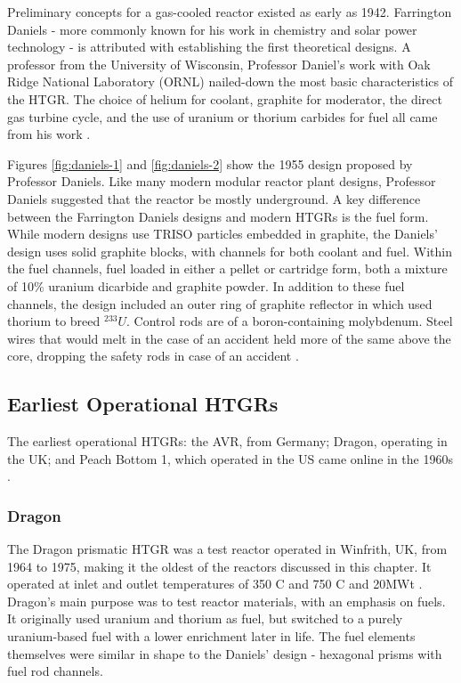 Preliminary concepts for a gas-cooled reactor existed as early as 1942.  Farrington Daniels - more commonly known for his work in chemistry and solar power technology - is attributed with establishing the first theoretical designs.  A professor from the University of Wisconsin, Professor Daniel's work with Oak Ridge National Laboratory (ORNL) nailed-down the most basic characteristics of the HTGR.  The choice of helium for coolant, graphite for moderator, the direct gas turbine cycle, and the use of uranium or thorium carbides for fuel all came from his work \cite{simnad_early_1991}.




Figures \ref{fig:daniels-1} and \ref{fig:daniels-2} show the 1955 design proposed by Professor Daniels.  Like many modern modular reactor plant designs, Professor Daniels suggested that the reactor be mostly underground.  A key difference between the Farrington Daniels designs and modern HTGRs is the fuel form.  While modern designs use TRISO particles embedded in graphite, the Daniels' design uses solid graphite blocks, with channels for both coolant and fuel.  Within the fuel channels, fuel loaded in either a pellet or cartridge form, both a mixture of 10$\%$ uranium dicarbide and graphite powder.  In addition to these fuel channels, the design included an outer ring of graphite reflector in which used thorium to breed $^{233}U$.  Control rods are of a boron-containing molybdenum.  Steel wires that would melt in the case of an accident held more of the same above the core, dropping the safety rods in case of an accident \cite{simnad_early_1991}.

\subsection{Earliest Operational HTGRs}

The earliest operational HTGRs: the AVR, from Germany; Dragon, operating in the UK; and Peach Bottom 1, which operated in the US came online in the 1960s \cite{beck_high_nodate}.

\subsubsection{Dragon}

The Dragon prismatic HTGR was a test reactor operated in Winfrith, UK, from 1964 to 1975, making it the oldest of the reactors discussed in this chapter.  It operated at inlet and outlet temperatures of 350 \textdegree C and 750 \textdegree C and 20MWt \cite{beck_high_nodate}.  Dragon's main purpose was to test reactor materials, with an emphasis on fuels.  It originally used uranium and thorium as fuel, but switched to a purely uranium-based fuel with a lower enrichment later in life.  The fuel elements themselves were similar in shape to the Daniels' design - hexagonal prisms with fuel rod channels.

